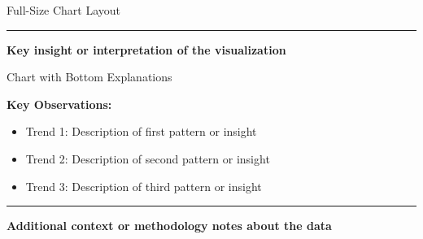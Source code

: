 \documentclass[8pt,aspectratio=169]{beamer}
\newcommand{\bottomnote}[1]{%
\vfill
\vspace{-2mm}
\textcolor{mllavender2}{\rule{\textwidth}{0.4pt}}
\vspace{1mm}
\footnotesize
\textbf{#1}
}
\begin{document}
\begin{frame}[t]{Full-Size Chart Layout}
\begin{center}
\vspace{0.5em}
\framebox[0.95\textwidth][c]{
\vspace{7cm}
\textcolor{midgray}{[Full-Size Chart/Visualization]}
\vspace{7cm}
}
\end{center}

\bottomnote{Key insight or interpretation of the visualization}
\end{frame}

\begin{frame}[t]{Chart with Bottom Explanations}
\begin{center}
\framebox[0.95\textwidth][c]{
\vspace{5cm}
\textcolor{midgray}{[Main Chart/Visualization]}
\vspace{5cm}
}
\end{center}

\vspace{0.5em}
\textbf{Key Observations:}
\begin{itemize}
\item Trend 1: Description of first pattern or insight
\item Trend 2: Description of second pattern or insight
\item Trend 3: Description of third pattern or insight
\end{itemize}

\bottomnote{Additional context or methodology notes about the data}
\end{frame}
\end{document}
